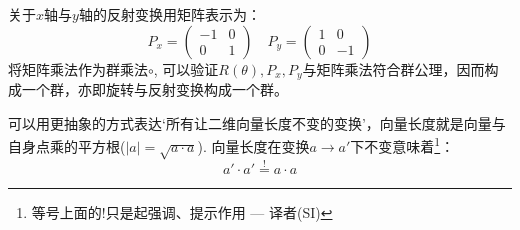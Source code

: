 关于$x$轴与$y$轴的反射变换用矩阵表示为：
\begin{equation}
\label{equ3.4}
P_x = 	\begin{pmatrix}
			-1 & 0 \\ 0 & 1
		\end{pmatrix}
\quad
P_y = 	\begin{pmatrix}
			1 & 0 \\ 0 & -1
		\end{pmatrix}
\end{equation}
将矩阵乘法作为群乘法$\circ$, 可以验证$R(\theta), P_x, P_y$与矩阵乘法符合群公理，因而构成一个群，亦即旋转与反射变换构成一个群。

可以用更抽象的方式表达‘所有让二维向量长度不变的变换’，向量长度就是向量与自身点乘的平方根($|a| = \sqrt{a \cdot a}$). 向量长度在变换$a \rightarrow a'$下不变意味着\footnote{等号上面的!只是起强调、提示作用 --- 译者(SI)}：
\begin{equation}
\label{equ3.5}
a' \cdot a' \stackrel{!}{=} a \cdot a
\end{equation}

